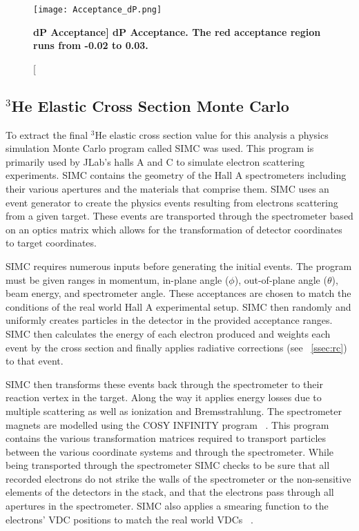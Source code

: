 \begin{figure}[!ht]
\begin{center}
\texttt{[image: Acceptance\_dP.png]}
\end{center}
\caption[\bf{dP Acceptance}]{
{\bf{dP Acceptance.}} The red acceptance region runs from -0.02 to 0.03.}
\label{fig:acceptance_dp}
\end{figure}

\subsection{$^3$He Elastic Cross Section Monte Carlo}
\label{ssec:simc}

To extract the final $^3$He elastic cross section value for this analysis a physics simulation Monte Carlo program called SIMC was used. This program is primarily used by JLab's halls A and C to simulate electron scattering experiments. SIMC contains the geometry of the Hall A spectrometers including their various apertures and the materials that comprise them. SIMC uses an event generator to create the physics events resulting from electrons scattering from a given target. These events are transported through the spectrometer based on an optics matrix which allows for the transformation of detector coordinates to target coordinates. 

SIMC requires numerous inputs before generating the initial events. The program must be given ranges in momentum, in-plane angle ($\phi$), out-of-plane angle ($\theta$), beam energy, and spectrometer angle. These acceptances are chosen to match the conditions of the real world Hall A experimental setup. SIMC then randomly and uniformly creates particles in the detector in the provided acceptance ranges. SIMC then calculates the energy of each electron produced and weights each event by the cross section and finally applies radiative corrections (see ~\ref{ssec:rc}) to that event. 

SIMC then transforms these events back through the spectrometer to their reaction vertex in the target. Along the way it applies energy losses due to multiple scattering as well as ionization and Bremsstrahlung. The spectrometer magnets are modelled using the COSY INFINITY program ~\cite{cosy}. This program contains the various transformation matrices required to transport particles between the various coordinate systems and through the spectrometer. While being transported through the spectrometer SIMC checks to be sure that all recorded electrons do not strike the walls of the spectrometer or the non-sensitive elements of the detectors in the stack, and that the electrons pass through all apertures in the spectrometer. SIMC also applies a smearing function to the electrons' VDC positions to match the real world VDCs ~\cite{Thesis:Wang}. 

